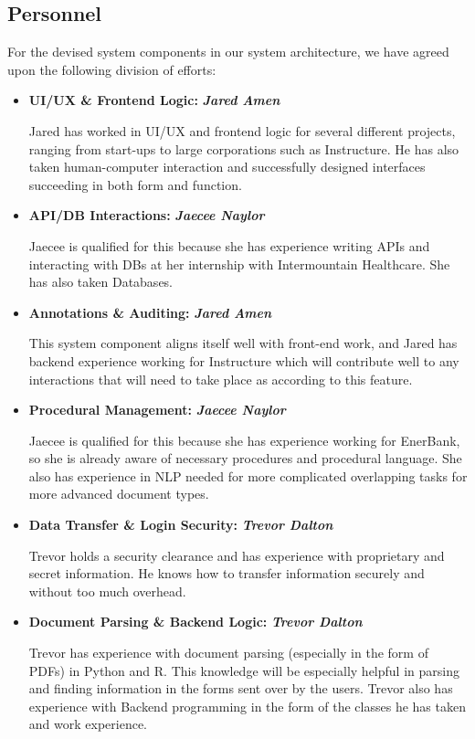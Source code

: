 \doublespacing

\subsection{Personnel}

For the devised system components in our system architecture, we have agreed upon the following division of efforts:

\begin{itemize}
    \item \textbf{UI/UX \& Frontend Logic:} \textbf{\textit{Jared Amen}}
    
    Jared has worked in UI/UX and frontend logic for several different projects, ranging from start-ups to large corporations such as Instructure. He has also taken human-computer interaction and successfully designed interfaces succeeding in both form and function.
    
    \item \textbf{API/DB Interactions:} \textbf{\textit{Jaecee Naylor}}
    
    Jaecee is qualified for this because she has experience writing APIs and interacting with DBs at her internship with Intermountain Healthcare. She has also taken Databases.
    
    \item \textbf{Annotations \& Auditing:} \textbf{\textit{Jared Amen}}
    
    This system component aligns itself well with front-end work, and Jared has backend experience working for Instructure which will contribute well to any interactions that will need to take place as according to this feature. 
    
    \item \textbf{Procedural Management:} \textbf{\textit{Jaecee Naylor}}
    
    Jaecee is qualified for this because she has experience working for EnerBank, so she is already aware of necessary procedures and procedural language. She also has experience in NLP needed for more complicated overlapping tasks for more advanced document types.
    
    \item \textbf{Data Transfer \& Login Security:} \textbf{\textit{Trevor Dalton}}
    
    Trevor holds a security clearance and has experience with proprietary and secret information. He knows how to transfer information securely and without too much overhead.
    
    \item \textbf{Document Parsing \& Backend Logic:} \textbf{\textit{Trevor Dalton}}
    
    Trevor has experience with document parsing (especially in the form of PDFs) in Python and R. This knowledge will be especially helpful in parsing and finding information in the forms sent over by the users. Trevor also has experience with Backend programming in the form of the classes he has taken and work experience.
\end{itemize}

\singlespacing